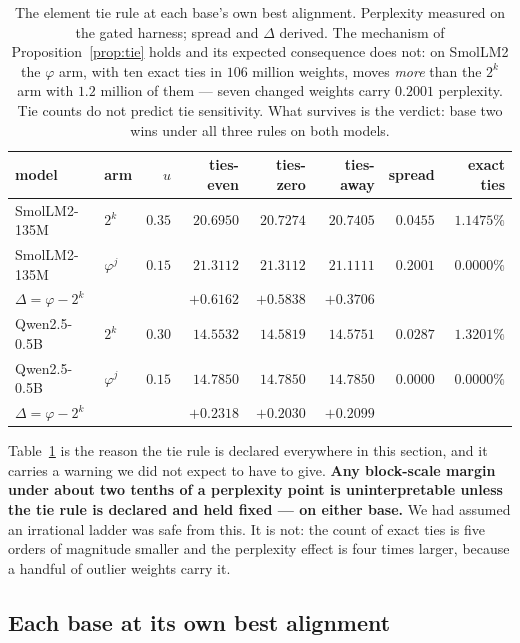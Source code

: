 \documentclass[11pt]{article}
\theoremstyle{definition}
\begin{document}
\begin{table}[t]\centering
\caption{The element tie rule at each base's own best alignment. Perplexity
measured on the gated harness; spread and $\Delta$ derived. The mechanism of
Proposition~\ref{prop:tie} holds and its expected consequence does not: on
SmolLM2 the $\varphi$ arm, with ten exact ties in $106$ million weights, moves
\emph{more} than the $2^{k}$ arm with $1.2$ million of them --- seven changed
weights carry $0.2001$ perplexity. Tie counts do not predict tie sensitivity.
What survives is the verdict: base two wins under all three rules on both
models.}
\label{tab:tie}
\begin{tabular}{llrrrrrr}
\toprule
model & arm & $u$ & ties-even & ties-zero & ties-away & spread & exact ties \\
\midrule
SmolLM2-135M & $2^{k}$       & $0.35$ & $20.6950$ & $20.7274$ & $20.7405$ & $0.0455$ & $1.1475\%$ \\
SmolLM2-135M & $\varphi^{j}$ & $0.15$ & $21.3112$ & $21.3112$ & $21.1111$ & $0.2001$ & $0.0000\%$ \\
\multicolumn{2}{l}{\quad $\Delta = \varphi - 2^{k}$} & & $+0.6162$ & $+0.5838$ & $+0.3706$ & & \\
\addlinespace
Qwen2.5-0.5B & $2^{k}$       & $0.30$ & $14.5532$ & $14.5819$ & $14.5751$ & $0.0287$ & $1.3201\%$ \\
Qwen2.5-0.5B & $\varphi^{j}$ & $0.15$ & $14.7850$ & $14.7850$ & $14.7850$ & $0.0000$ & $0.0000\%$ \\
\multicolumn{2}{l}{\quad $\Delta = \varphi - 2^{k}$} & & $+0.2318$ & $+0.2030$ & $+0.2099$ & & \\
\bottomrule
\end{tabular}
\end{table}

Table~\ref{tab:tie} is the reason the tie rule is declared everywhere in this
section, and it carries a warning we did not expect to have to give.
\textbf{Any block-scale margin under about two tenths of a perplexity point is
uninterpretable unless the tie rule is declared and held fixed --- on either
base.} We had assumed an irrational ladder was safe from this. It is not: the
count of exact ties is five orders of magnitude smaller and the perplexity
effect is four times larger, because a handful of outlier weights carry it.

\subsection{Each base at its own best alignment}
\label{sec:controlled}
\end{document}
